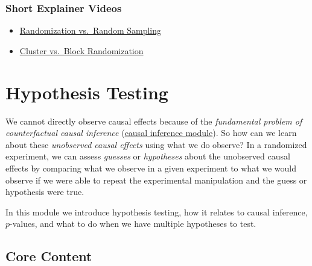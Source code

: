 \documentclass[12pt,]{book}
\begin{document}
\hypertarget{short-explainer-videos}{%
\subsection{Short Explainer Videos}\label{short-explainer-videos}}

\begin{itemize}
\item
  \href{https://www.youtu.be/02A61b3hxvA}{Randomization vs.~Random Sampling}
\item
  \href{https://www.youtu.be/bL2U9z8hX1k}{Cluster vs.~Block Randomization}
\end{itemize}

\hypertarget{hypothesis-testing}{%
\chapter{Hypothesis Testing}\label{hypothesis-testing}}

We cannot directly observe causal effects because of the \emph{fundamental problem of counterfactual causal inference} (\href{causal-inference.html}{causal inference module}). So how can we learn about these \emph{unobserved causal effects} using what we do observe? In a randomized experiment, we can assess \emph{guesses} or \emph{hypotheses} about the unobserved causal effects by comparing what we observe in a given experiment to what we would observe if we were able to repeat the experimental manipulation and the guess or hypothesis were true.

In this module we introduce hypothesis testing, how it relates to causal inference, \(p\)-values, and what to do when we have multiple hypotheses to test.

\hypertarget{core-content-3}{%
\section{Core Content}\label{core-content-3}}
\end{document}
